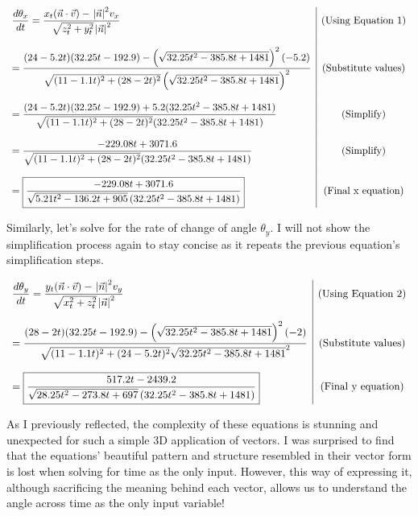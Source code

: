 \documentclass[12pt]{article}
\begin{document}
$$
\begin{array}{l|c}
    \dfrac{d\theta_x}{dt} = \dfrac{x_t(\vec n \cdot \vec v) - {\;\abs{\vec n}}^2 v_x}{\sqrt{z_t^2 + y_t^2} {\;\abs{\vec n}}^2} & \text{(Using Equation 1)} \\ \\
    = \dfrac{(24-5.2t)(32.25t-192.9) - \left(\sqrt{32.25t^2 - 385.8t + 1481}\right)^2 (-5.2)}{\sqrt{(11-1.1t)^2 + (28-2t)^2} \left( \sqrt{32.25t^2 - 385.8t + 1481}\right)^2} & \text{(Substitute values)}\\ \\
    = \dfrac{(24-5.2t)(32.25t-192.9) + 5.2(32.25t^2 - 385.8t + 1481)}{\sqrt{(11-1.1t)^2 + (28-2t)^2} (32.25t^2 - 385.8t + 1481)} & \text{(Simplify)}\\ \\
    = \dfrac{-229.08t+3071.6}{\sqrt{(11-1.1t)^2 + (28-2t)^2} (32.25t^2 - 385.8t + 1481)} & \text{(Simplify)}\\ \\
    = \boxed{\dfrac{-229.08t+3071.6}{\sqrt{5.21t^2-136.2t+905} \left(32.25t^2 - 385.8t + 1481\right)}} & \text{(Final x equation)}\\
 \end{array} 
$$

\vspace{25pt}

Similarly, let's solve for the rate of change of angle $\theta_y$. I will not show the simplification process again to stay concise as it repeats the previous equation's simplification steps.


$$
\begin{array}{l|c}
    \dfrac{d\theta_y}{dt} = \dfrac{y_t(\vec n \cdot \vec v) - {\;\abs{\vec n}}^2 v_y}{\sqrt{x_t^2 + z_t^2} {\;\abs{\vec n}}^2} & \text{(Using Equation 2)}\\ \\
    = \dfrac{ (28-2t)(32.25t-192.9) - \left( \sqrt{32.25t^2 - 385.8t + 1481}\right)^2 (-2)}{\sqrt{(11-1.1t)^2 + (24-5.2t)^2} \sqrt{32.25t^2 - 385.8t + 1481}^2} & \text{(Substitute values)}\\ \\
    = \boxed{\dfrac{517.2t-2439.2}{\sqrt{28.25t^2-273.8t+697} \left(32.25t^2 - 385.8t + 1481\right)}} & \text{(Final y equation)}\\
 \end{array} 
$$

As I previously reflected, the complexity of these equations is stunning and unexpected for such a simple 3D application of vectors. I was surprised to find that the equations' beautiful pattern and structure resembled in their vector form is lost when solving for time as the only input. However, this way of expressing it, although sacrificing the meaning behind each vector, allows us to understand the angle across time as the only input variable! 
\end{document}
